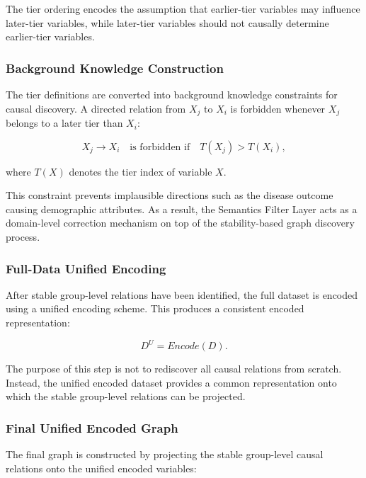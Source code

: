 \documentclass[conference, a4paper]{IEEEtran}
\begin{document}
The tier ordering encodes the assumption that earlier-tier variables may influence later-tier variables, while later-tier variables should not causally determine earlier-tier variables.

\subsubsection{Background Knowledge Construction}

The tier definitions are converted into background knowledge constraints for causal discovery. A directed relation from $X_j$ to $X_i$ is forbidden whenever $X_j$ belongs to a later tier than $X_i$:

\begin{equation}
X_j \rightarrow X_i \quad \text{is forbidden if} \quad
T(X_j) > T(X_i),
\end{equation}

where $T(X)$ denotes the tier index of variable $X$.

This constraint prevents implausible directions such as the disease outcome causing demographic attributes. As a result, the Semantics Filter Layer acts as a domain-level correction mechanism on top of the stability-based graph discovery process.

\subsubsection{Full-Data Unified Encoding}

After stable group-level relations have been identified, the full dataset is encoded using a unified encoding scheme. This produces a consistent encoded representation:

\begin{equation}
D^{U} = Encode(D).
\end{equation}

The purpose of this step is not to rediscover all causal relations from scratch. Instead, the unified encoded dataset provides a common representation onto which the stable group-level relations can be projected.

\subsubsection{Final Unified Encoded Graph}

The final graph is constructed by projecting the stable group-level causal relations onto the unified encoded variables:
\end{document}

